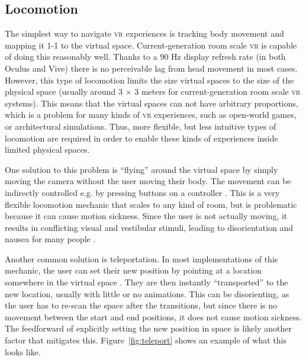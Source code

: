 \documentclass[nobib]{tufte-book} %
\begin{document}
\subsection{Locomotion}
The simplest way to navigate \textsc{vr} experiences is tracking body movement and mapping it 1-1 to the virtual space. Current-generation room scale \textsc{vr} is capable of doing this reasonably well. Thanks to a 90 Hz display refresh rate (in both Oculus and Vive) there is no perceivable lag from head movement in most cases. However, this type of locomotion limits the size virtual spaces to the size of the physical space (usually around $3$ $\times$ $3$ meters for current-generation room scale \textsc{vr} systems). This means that the virtual spaces can not have arbitrary proportions, which is a problem for many kinds of \textsc{vr} experiences, such as open-world games, or architectural simulations. Thus, more flexible, but less intuitive types of locomotion are required in order to enable these kinds of experiences inside limited physical spaces.

One solution to this problem is ``flying'' around the virtual space by simply moving the camera without the user moving their body. The movement can be indirectly controlled e.g. by pressing buttons on a controller \cite{bowman1996evaluation}. This is a very flexible locomotion mechanic that scales to any kind of room, but is problematic because it can cause motion sickness. Since the user is not actually moving, it results in conflicting visual and vestibular stimuli, leading to disorientation and nausea for many people \cite{akiduki2003visual}.

Another common solution is teleportation. In most implementations of this mechanic, the user can set their new position by pointing at a location somewhere in the virtual space \cite{bozgeyikli2016point}. They are then instantly ``transported'' to the new location, usually with little or no animations. This can be disorienting, as the user has to re-scan the space after the transitions, but since there is no movement between the start and end positions, it does not cause motion sickness. The feedforward of explicitly setting the new position in space is likely another factor that mitigates this. Figure~\ref{fig:teleport} shows an example of what this looks like.
\end{document}
